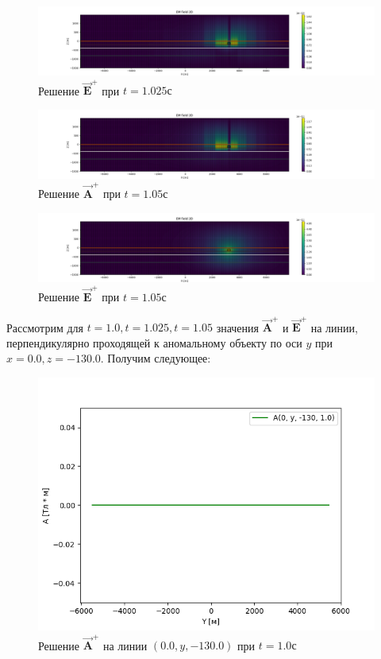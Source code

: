 \begin{figure}
	\centering
	\includegraphics[width=1.0\linewidth]{images/Answer_E_plus_time_layer_1.0250000000000006.png}
	\caption{Решение $\overrightarrow{\textbf{E}}^+$ при $t = 1.025с$}
	\label{fig:E_plus_t1}
\end{figure} 

\begin{figure}
	\centering
	\includegraphics[width=1.0\linewidth]{images/Answer_A_plus_time_layer_1.05.png}
	\caption{Решение $\overrightarrow{\textbf{A}}^+$ при $t = 1.05с$}
	\label{fig:A_plus_t2}
\end{figure} 


\begin{figure}
	\centering
	\includegraphics[width=1.0\linewidth]{images/Answer_E_plus_time_layer_1.05.png}
	\caption{Решение $\overrightarrow{\textbf{E}}^+$ при $t = 1.05с$}
	\label{fig:E_plus_t2}
\end{figure} 

Рассмотрим для $t = 1.0, t = 1.025, t = 1.05$ значения $\overrightarrow{\textbf{A}}^+$ и $\overrightarrow{\textbf{E}}^+$ на линии, перпендикулярно проходящей к аномальному объекту по оси $y$ при $x = 0.0, z = -130.0$. Получим следующее:

\begin{figure}
	\centering
	\includegraphics[width=0.5\linewidth]{images/Normal_A(y)_1.png}
	\caption{Решение $\overrightarrow{\textbf{A}}^+$ на линии $(0.0, y, -130.0)$ при $t = 1.0с$}
	\label{fig:A_line_t0}
\end{figure} 

